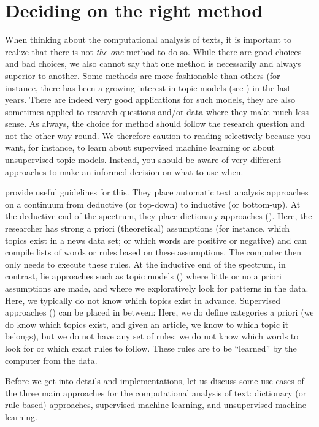 \section{Deciding on the right method}
\label{sec:deciding}

When thinking about the computational analysis of texts, it is
important to realize that there is not \emph{the one} method to do
so. While there are good choices and bad choices, we also cannot say
that one method is necessarily and always superior to another. Some
methods are more fashionable than others (for instance, there has been
a growing interest in topic models (see ) in the
last years. There are indeed very good applications for such models,
they are also sometimes applied to research questions and/or data
where they make much less sense.  As always, the choice for method
should follow the research question and not the other way round. We
therefore caution to reading  selectively because you
want, for instance, to learn about supervised machine learning or about
unsupervised topic models. Instead, you should be aware of very
different approaches to make an informed decision on what to use when.

\cite{Boumans2016} provide useful guidelines for this. They place
automatic text analysis approaches on a continuum from deductive (or
top-down) to inductive (or bottom-up). At the deductive end of the
spectrum, they place dictionary approaches
(). Here, the researcher has strong a priori
(theoretical) assumptions (for instance, which topics exist in a news
data set; or which words are positive or negative) and can compile
lists of words or rules based on these assumptions. The computer then
only needs to execute these rules. At the inductive end of the
spectrum, in contrast, lie approaches such as topic models
() where little or no a priori assumptions are
made, and where we exploratively look for patterns in the data. Here,
we typically do not know which topics exist in advance. Supervised
approaches () can be placed in between: Here, we do
define categories a priori (we do know which topics exist, and given
an article, we know to which topic it belongs), but we do not have
any set of rules: we do not know which words to look for or which
exact rules to follow. These rules are to be ``learned'' by the computer
from the data.

Before we get into details and implementations, let us discuss some
use cases of the three main approaches for the
computational analysis of text: dictionary (or rule-based) approaches,
supervised machine learning, and unsupervised machine learning.

